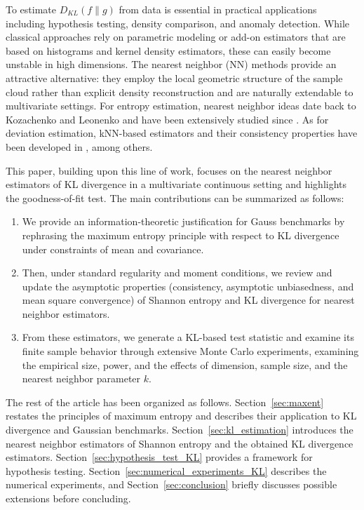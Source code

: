 \documentclass[12pt,a4paper]{article}
\theoremstyle{definition}
\theoremstyle{plain}
\begin{document}
To estimate $D_{KL}(f\|g)$ from data is essential in practical applications including hypothesis testing, density comparison, and anomaly detection. While classical approaches rely on parametric modeling or add-on estimators that are based on histograms and kernel density estimators, these can easily become unstable in high dimensions. The nearest neighbor (NN) methods provide an attractive alternative: they employ the local geometric structure of the sample cloud rather than explicit density reconstruction and are naturally extendable to multivariate settings. For entropy estimation, nearest neighbor ideas date back to Kozachenko and Leonenko \cite{kozachenko1987} and have been extensively studied since \cite{goria2005,leonenko2008,penrose2011,penrose2013,berrett2019a,paninski2003estimation}. As for deviation estimation, kNN-based estimators and their consistency properties have been developed in \cite{perez2008kullback,Wang2009,gao2018,bulinski2019}, among others.

This paper, building upon this line of work, focuses on the nearest neighbor estimators of KL divergence in a multivariate continuous setting and highlights the goodness-of-fit test. The main contributions can be summarized as follows:
\begin{enumerate}[label=\roman*.]
\item We provide an information-theoretic justification for Gauss benchmarks by rephrasing the maximum entropy principle with respect to KL divergence under constraints of mean and covariance.
\item Then, under standard regularity and moment conditions, we review and update the asymptotic properties (consistency, asymptotic unbiasedness, and mean square convergence) of Shannon entropy and KL divergence for nearest neighbor estimators.
\item From these estimators, we generate a KL-based test statistic and examine its finite sample behavior through extensive Monte Carlo experiments, examining the empirical size, power, and the effects of dimension, sample size, and
the nearest neighbor parameter $k$.
\end{enumerate}

The rest of the article has been organized as follows. Section~\ref{sec:maxent} restates the principles of maximum entropy and describes their application to KL divergence and Gaussian benchmarks. Section~\ref{sec:kl_estimation} introduces the nearest neighbor estimators of Shannon entropy and the obtained KL divergence
estimators. Section~\ref{sec:hypothesis_test_KL} provides a framework for hypothesis testing. Section~\ref{sec:numerical_experiments_KL} describes the numerical experiments, and Section~\ref{sec:conclusion} briefly discusses possible extensions before concluding.
\end{document}
